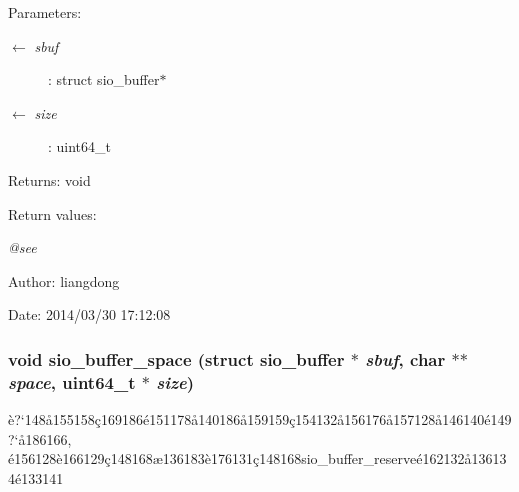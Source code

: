 \begin{Desc}
\item[Parameters:]
\begin{description}
\item[\mbox{$\leftarrow$} {\em sbuf}]: struct sio\_\-buffer$\ast$ \item[\mbox{$\leftarrow$} {\em size}]: uint64\_\-t \end{description}
\end{Desc}
\begin{Desc}
\item[Returns:]void \end{Desc}
\begin{Desc}
\item[Return values:]
\begin{description}
\item[{\em @see}]\end{description}
\end{Desc}
\begin{Desc}
\item[Author:]liangdong \end{Desc}
\begin{Desc}
\item[Date:]2014/03/30 17:12:08 \end{Desc}
\subsubsection{\setlength{\rightskip}{0pt plus 5cm}void sio\_\-buffer\_\-space (struct sio\_\-buffer $\ast$ {\em sbuf}, char $\ast$$\ast$ {\em space}, uint64\_\-t $\ast$ {\em size})}\label{sio__buffer_8h_a8}


\`{e}?`148\aa{}155158\c{c}169186\'{e}151178\aa{}140186\aa{}159159\c{c}154132\aa{}156176\aa{}157128\aa{}146140\'{e}149?`\aa{}186166, \'{e}156128\`{e}166129\c{c}148168\ae{}136183\`{e}176131\c{c}148168sio\_\-buffer\_\-reserve\'{e}162132\aa{}136134\'{e}133141 

